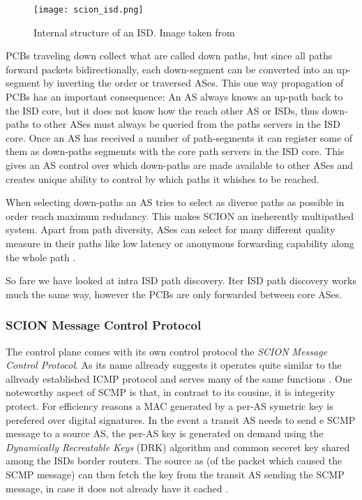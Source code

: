 \documentclass[../eva1_scion.tex]{subfiles}
\begin{document}
    \begin{figure}[ht]
        \centering
        \texttt{[image: scion\_isd.png]}
        \caption{Internal structure of an ISD. Image taken from \cite{scion_2017}}%
        \label{fig:isd}
    \end{figure}

    PCBs traveling down collect what are called down paths, but since all paths forward packets bidirectionally, each down-segment can be converted into an up-segment by inverting the order or traversed ASes. This one way propagation of PCBs has an important consequence: An AS always knows an up-path back to the ISD core, but it does not know how the reach other AS or ISDs, thus down-paths to other ASes must always be queried from the paths servers in the ISD core. Once an AS has received a number of path-segments it can register some of them as down-paths segmemts with the core path servers in the ISD core. This gives an AS control over which down-paths are made available to other ASes and creates unique ability to control by which paths it whishes to be reached.

    When selecting down-paths an AS tries to select as diverse paths as possible in order reach maximum redudancy. This makes SCION an ineherently multipathed system. Apart from path diversity, ASes can select for many different quality measure in their paths like low latency or anonymous forwarding capability along the whole path \cite{scion_2011}.

    So fare we have looked at intra ISD path discovery. Iter ISD path discovery works much the same way, however the PCBs are only forwarded between core ASes.
    
    \subsubsection{SCION Message Control Protocol}
    The control plane comes with its own control protocol the \textit{SCION Message Control Protocol}. As its name allready suggests it operates quite similar to the allready established ICMP protocol and serves many of the same functions \cite{scion_2015}. One noteworthy aspect of SCMP is that, in contrast to its cousine, it is integerity protect. For efficiency reasons a MAC generated by a per-AS symetric key is perefered over digital signatures. In the event a transit AS needs to send e SCMP message to a source AS, the per-AS key is generated on demand using the \textit{Dynamically Recreatable Keys} (DRK) algorithm and common seceret key shared among the ISDs border routers. The source as (of the packet which caused the SCMP message) can then fetch the key from the transit AS sending the SCMP message, in case it does not already have it cached \cite{scion_2015}. 
\end{document}
